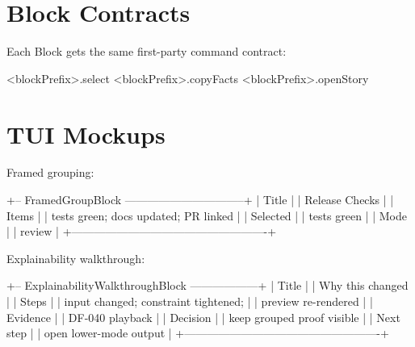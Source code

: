 \section{Block Contracts}\label{record-094-block-contracts}



Each Block gets the same first-party command contract:

\begin{CodeBlock}
<blockPrefix>.select
<blockPrefix>.copyFacts
<blockPrefix>.openStory
\end{CodeBlock}

\section{TUI Mockups}\label{record-094-tui-mockups}

Framed grouping:

\begin{CodeBlock}
+-- FramedGroupBlock --------------------------------+
| Title                                              |
|   Release Checks                                   |
| Items                                              |
|   tests green; docs updated; PR linked             |
| Selected                                           |
|   tests green                                      |
| Mode                                               |
|   review                                           |
+----------------------------------------------------+
\end{CodeBlock}

Explainability walkthrough:

\begin{CodeBlock}
+-- ExplainabilityWalkthroughBlock ------------------+
| Title                                              |
|   Why this changed                                 |
| Steps                                              |
|   input changed; constraint tightened;             |
|   preview re-rendered                              |
| Evidence                                           |
|   DF-040 playback                                  |
| Decision                                           |
|   keep grouped proof visible                       |
| Next step                                          |
|   open lower-mode output                           |
+----------------------------------------------------+
\end{CodeBlock}

